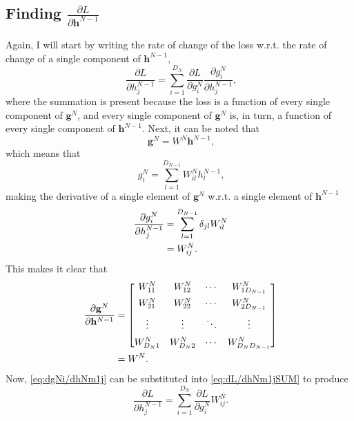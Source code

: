 \documentclass{article}
\newcommand{\pc}[0]{\phantom{,}}
\newcommand{\pd}[0]{\phantom{.}}
\begin{document}
\subsection{Finding \texorpdfstring{$\frac{\partial L}{\partial \mathbf{h}^{N-1}}$}{dL/dhNm1}}
\label{sec:dL/dhNm1}

Again, I will start by writing the rate of change of the loss w.r.t. the rate of change of a single component of $\mathbf{h}^{N-1}$,
\begin{equation}
    \label{eq:dL/dhNm1jSUM}
    \pc\frac{\partial L}{\partial h^{N-1}_j} = \displaystyle\sum_{i=1}^{D_N}\frac{\partial L}{\partial g^N_i}\frac{\partial g^N_i}{\partial h^{N-1}_j},
\end{equation}
where the summation is present because the loss is a function of every single component of $\mathbf{g}^N$, and every single component of $\mathbf{g}^N$ is, in turn, a function of every single component of $\mathbf{h}^{N-1}$. Next, it can be noted that
\begin{equation}
    \pc\mathbf{g}^N = W^N\mathbf{h}^{N-1},
\end{equation}
which means that
\begin{equation}
    \pc g^N_i = \displaystyle\sum_{l=1}^{D_{N-1}}W^N_{il}h^{N-1}_l,
\end{equation}
making the derivative of a single element of $\mathbf{g}^N$ w.r.t. a single element of $\mathbf{h}^{N-1}$
\begin{align}
    \label{eq:dgNi/dhNm1j}
    \pd\frac{\partial g^N_i}{\partial h^{N-1}_j} &= \displaystyle\sum_{l=1}^{D_{N-1}}\delta_{jl}W^N_{il}\notag \\
    &= W^N_{ij}.
\end{align}
This makes it clear that
\begin{align}
    \pd\frac{\partial \mathbf{g}^N}{\partial \mathbf{h}^{N-1}} &=
    \begin{bmatrix}
        W^N_{11} & W^N_{12} & \cdots & W^N_{1D_{N-1}} \\[0.5em]
        W^N_{21} & W^N_{22} & \cdots & W^N_{2D_{N-1}} \\[0.5em]
        \vdots & \vdots & \ddots & \vdots \\[0.5em]
        W^N_{D_N1} & W^N_{D_N2} & \cdots & W^N_{D_ND_{N-1}}
    \end{bmatrix}\notag \\
    &= W^N.
\end{align}
Now, \cref{eq:dgNi/dhNm1j} can be substituted into \cref{eq:dL/dhNm1jSUM} to produce
\begin{equation}
    \label{eq:dL/dhNm1j}
    \pd\frac{\partial L}{\partial h^{N-1}_j} = \displaystyle\sum_{i=1}^{D_N}\frac{\partial L}{\partial g^N_i}W^N_{ij}.
\end{equation}
\end{document}
